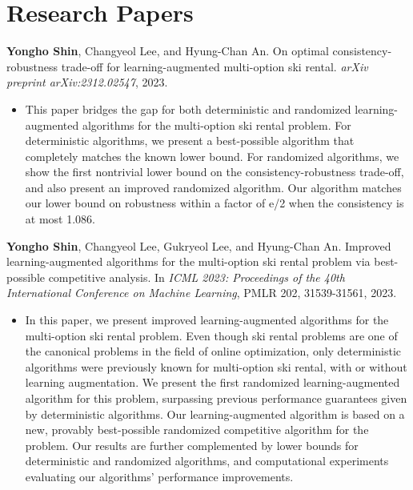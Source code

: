 \documentclass{cv}
\begin{document}
\section{Research Papers}
\textbf{Yongho Shin}, Changyeol Lee, and Hyung-Chan An. On optimal consistency-robustness trade-off for learning-augmented multi-option ski rental. \emph{arXiv preprint arXiv:2312.02547}, 2023.
\vspace{\killinitspace}
\begin{itemize}
\item This paper bridges the gap for both deterministic and randomized learning-augmented algorithms for the multi-option ski rental problem. For deterministic algorithms, we present a best-possible algorithm that completely matches the known lower bound. For randomized algorithms, we show the first nontrivial lower bound on the consistency-robustness trade-off, and also present an improved randomized algorithm. Our algorithm matches our lower bound on robustness within a factor of e/2 when the consistency is at most 1.086.
\end{itemize}

\textbf{Yongho Shin}, Changyeol Lee, Gukryeol Lee, and Hyung-Chan An. Improved learning-augmented algorithms for the multi-option ski rental problem via best-possible competitive analysis. In \emph{ICML 2023: Proceedings of the 40th International Conference on Machine Learning}, PMLR 202, 31539-31561, 2023.
\vspace{\killinitspace}
\begin{itemize}
\item In this paper, we present improved learning-augmented algorithms for the multi-option ski rental problem. Even though ski rental problems are one of the canonical problems in the field of online optimization, only deterministic algorithms were previously known for multi-option ski rental, with or without learning augmentation. We present the first randomized learning-augmented algorithm for this problem, surpassing previous performance guarantees given by deterministic algorithms. Our learning-augmented algorithm is based on a new, provably best-possible randomized competitive algorithm for the problem. Our results are further complemented by lower bounds for deterministic and randomized algorithms, and computational experiments evaluating our algorithms’ performance improvements.
\end{itemize}
\end{document}
